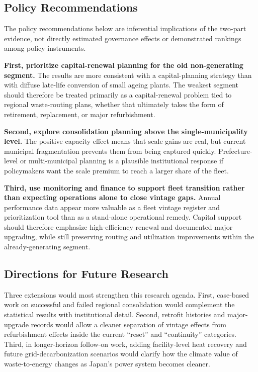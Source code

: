 \documentclass[12pt,a4paper]{article}
\begin{document}
\subsection{Policy Recommendations}

The policy recommendations below are inferential implications of the two-part evidence, not directly estimated governance effects or demonstrated rankings among policy instruments.

\textbf{First, prioritize capital-renewal planning for the old non-generating segment.} The results are more consistent with a capital-planning strategy than with diffuse late-life conversion of small ageing plants. The weakest segment should therefore be treated primarily as a capital-renewal problem tied to regional waste-routing plans, whether that ultimately takes the form of retirement, replacement, or major refurbishment.

\textbf{Second, explore consolidation planning above the single-municipality level.} The positive capacity effect means that scale gains are real, but current municipal fragmentation prevents them from being captured quickly. Prefecture-level or multi-municipal planning is a plausible institutional response if policymakers want the scale premium to reach a larger share of the fleet.

\textbf{Third, use monitoring and finance to support fleet transition rather than expecting operations alone to close vintage gaps.} Annual performance data appear more valuable as a fleet vintage register and prioritization tool than as a stand-alone operational remedy. Capital support should therefore emphasize high-efficiency renewal and documented major upgrading, while still preserving routing and utilization improvements within the already-generating segment.

\subsection{Directions for Future Research}

Three extensions would most strengthen this research agenda. First, case-based work on successful and failed regional consolidation would complement the statistical results with institutional detail. Second, retrofit histories and major-upgrade records would allow a cleaner separation of vintage effects from refurbishment effects inside the current ``reset'' and ``continuity'' categories. Third, in longer-horizon follow-on work, adding facility-level heat recovery and future grid-decarbonization scenarios would clarify how the climate value of waste-to-energy changes as Japan's power system becomes cleaner.
\end{document}
